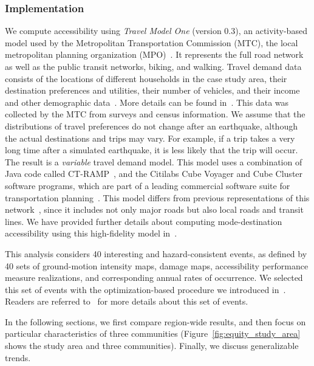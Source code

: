 \subsubsection{Implementation}
We compute accessibility using  \emph{Travel Model One} (version 0.3), an activity-based model used by the Metropolitan Transportation Commission (MTC), the local metropolitan planning organization (MPO)~\cite{erhardt_mtcs_2012}. It represents the full road network as well as the public transit networks, biking, and walking. Travel demand data consists of the locations of different households in the case study area, their destination preferences and utilities, their number of vehicles, and their income and other demographic data~\cite{erhardt_mtcs_2012,ory_personal_2013}. More details can be found in~\cite{waddell_urbansim:_2002}. This data was collected by the MTC from surveys and census information. We assume that the distributions of travel preferences do not change after an earthquake, although the actual destinations and trips may vary. For example, if a trip takes a very long time after a simulated earthquake, it is less likely that the trip will occur. The result is a \emph{variable} travel demand model. This model uses a combination of Java code called CT-RAMP~\cite{davidson_ct-ramp_2010}, and the Citilabs Cube Voyager and Cube Cluster software programs, which are part of a leading commercial software suite for transportation planning~\cite{erhardt_mtcs_2012}. This model differs from previous representations of this network~\cite[e.g.,][]{jayaram_efficient_2010,wakabayashi_network_1992}, since it includes not only major roads but also local roads and transit lines. We have provided further details about computing mode-destination accessibility using this high-fidelity model in~\cite{miller_seismic_2014}.

This analysis considers 40 interesting and hazard-consistent events, as defined by 40 sets of ground-motion intensity maps, damage maps, accessibility performance measure realizations, and corresponding annual rates of occurrence. We selected this set of events with the optimization-based procedure we introduced in~\cite{miller_ground-motion_2014}. Readers are referred to~\cite{miller_seismic_2014} for more details about this set of events. 

In the following sections, we first compare region-wide results, and then focus on particular characteristics of three communities (Figure~\ref{fig:equity_study_area} shows the study area and three communities). Finally, we discuss generalizable trends.

